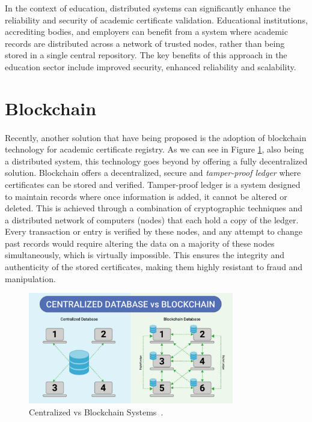In the context of education, distributed systems can significantly enhance the reliability and security of academic certificate validation.
Educational institutions, accrediting bodies, and employers can benefit from a system where academic records are distributed across a network of trusted nodes,
rather than being stored in a single central repository.
The key benefits of this approach in the education sector include improved security, enhanced reliability and scalability.

\section{Blockchain}\label{sec:blockchain}
\paragraph{}

Recently, another solution that have being proposed is the adoption of blockchain technology for academic certificate registry. As we can see in Figure \ref{fig:blockchain-vs-database}, also being a distributed system, this technology goes beyond by offering a fully decentralized solution.
Blockchain offers a decentralized, secure and \textit{tamper-proof ledger} where certificates can be stored and verified.
Tamper-proof ledger is a system designed to maintain records where once information is added, it cannot be altered or deleted. This is achieved through a combination of cryptographic techniques and a distributed network of computers (nodes) that each hold a copy of the ledger.
Every transaction or entry is verified by these nodes, and any attempt to change past records would require altering the data on a majority of these nodes simultaneously, which is virtually impossible. This ensures the integrity and authenticity of the stored certificates, making them highly resistant to fraud and manipulation.

\begin{figure}[H]\label{fig:blockchain-vs-database}
    \centering
    \includegraphics[width=0.8\textwidth]{assets/blockchain-vs-database.png}
    \caption{Centralized vs Blockchain Systems~\cite{blockchainDB}.}
\end{figure}


